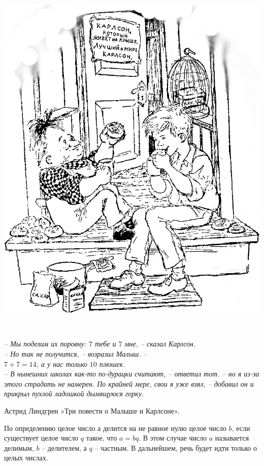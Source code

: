 
\begin{floatingfigure}[l]{0\textwidth}
	\includegraphics[scale=0.17]{./img/karlson}
\end{floatingfigure}~

\epigraph{
\textit{– Мы поделим их поровну: $7$ тебе и $7$ мне, – сказал Карлсон.\\
– Но так не получится, – возразил Малыш. –\\  $7+7=14$, а у нас только $10$ плюшек.\\
– В нынешних школах как-то по-дурацки считают, – ответил тот. – но я из-за этого страдать не намерен. По крайней мере, свои я уже взял, – добавил он и прикрыл пухлой ладошкой дымящуюся горку.
}}{Астрид Линдгрен «Три повести о Малыше и Карлсоне».}


По определению целое число $а$ делится на не равное нулю целое число $b$, если существует целое число $q$ такое, что $a = bq$. В этом случае число $a$ называется делимым, $b$ – делителем, а $q$ – частным. В дальнейшем, речь будет идти только о целых числах.

